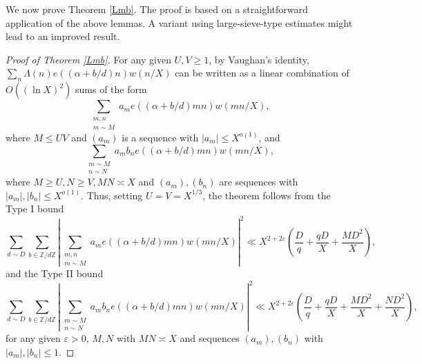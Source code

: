 \documentclass{amsart}
\theoremstyle{definition}
\theoremstyle{remark}
\newcommand{\1}{
    \bm{1}
}
\newcommand{\aZ}[1]{
\mathbb{Z}/{ #1 \mathbb{Z}}
}
\begin{document}
We now prove Theorem \ref{Lmb}. 
The proof is based on a straightforward application of the above lemmas. 
A variant using large-sieve-type estimates might lead to an improved result. 


\begin{proof}[Proof of Theorem \ref{Lmb}]

For any given $U,V \geq 1$, by Vaughan's identity, $\sum_{n} \Lambda(n) e((\alpha+b/d)n) w(n/X)$ can be written as a linear combination of $O((\ln{X})^2)$ sums of the form
\[ \sum_{\substack{m,n \\ m \sim M}} a_m e((\alpha+b/d)mn) w(mn/X), \]
where $M \leq UV$ and $(a_m)$ is a sequence with $|a_m| \leq X^{o(1)}$, and
\[ \sum_{\substack{m \sim M \\ n \sim N}} a_m b_n e((\alpha+b/d)mn) w(mn/X), \]
where $M \geq U, N \geq V, MN \asymp X$ and $(a_m),(b_n)$ are sequences with $|a_m|,|b_n| \leq X^{o(1)}$. Thus, setting $U=V=X^{1/3}$, the theorem follows from the Type I bound
\begin{equation}
\sum_{d \sim D} \sum_{b \in \aZ{d}} \left| \sum_{\substack{m,n \\ m \sim M}} a_m e((\alpha+b/d)mn) w(mn/X) \right|^2 \ll X^{2+2\varepsilon} \left( \frac{D}{q} + \frac{qD}{X} + \frac{MD^2}{X} \right), \label{exp_I}
\end{equation}
and the Type II bound
\begin{equation}
\sum_{d \sim D} \sum_{b \in \aZ{d}} \left| \sum_{\substack{m \sim M \\ n \sim N}} a_m b_n e((\alpha+b/d)mn) w(mn/X) \right|^2 \ll X^{2+2\varepsilon} \left( \frac{D}{q} + \frac{qD}{X} + \frac{MD^2}{X} + \frac{ND^2}{X} \right), \label{exp_II}
\end{equation}
for any given $\varepsilon>0$, $M,N$ with $MN \asymp X$ and sequences $(a_m),(b_n)$ with $|a_m|,|b_n|\leq 1$. 



\end{proof}
\end{document}

